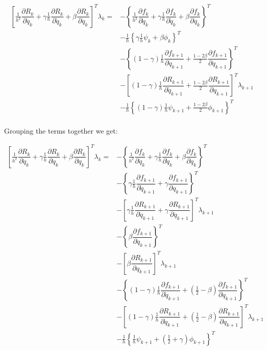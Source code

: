 \documentclass[10pt,letter]{book}
\newcommand{\pd}[2]{\dfrac{\partial #1}{\partial #2}}
\begin{document}
     \begin{equation}
       \begin{split}
         \left[ \frac{1}{h^2} \pd{R_k}{\ddot{q}_k} + \gamma \frac{1}{h} \pd{R_k}{\dot{q}_k} + \beta \pd{R_k}{{q}_k} \right]^T \lambda_k = &- \left\{ \frac{1}{h^2}  \pd{f_k}{\ddot{q}_k} + \gamma \frac{1}{h} \pd{f_k}{\dot{q}_k} + \beta \pd{f_k}{{q}_k} \right\}^T \\
         & -  \frac{1}{h}\left\{  \gamma \frac{1}{h}  \psi_k + \beta   \phi_k \right\}^T\\
         & -  \left\{ (1-\gamma) \frac{1}{h} \pd{f_{k+1}}{\dot{q}_{k+1}} + \frac{1-2\beta}{2} \pd{f_{k+1}}{{q}_{k+1}} \right\}^T \\
         & -  \left[ (1-\gamma) \frac{1}{h} \pd{R_{k+1}}{\dot{q}_{k+1}} + \frac{1-2\beta}{2} \pd{R_{k+1}}{{q}_{k+1}} \right]^T\lambda_{k+1} \\
         & -  \frac{1}{h} \left\{ (1-\gamma) \frac{1}{h} \psi_{k+1} + \frac{1-2\beta}{2} \phi_{k+1} \right\}^T\\
       \end{split}
     \end{equation}

     
     Grouping the terms together we get:

     \begin{equation}
       \begin{split}
         \left[ \frac{1}{h^2} \pd{R_k}{\ddot{q}_k} + \gamma \frac{1}{h} \pd{R_k}{\dot{q}_k} + \beta \pd{R_k}{{q}_k} \right]^T \lambda_k = &- \left\{ \frac{1}{h^2}  \pd{f_k}{\ddot{q}_k} + \gamma \frac{1}{h} \pd{f_k}{\dot{q}_k} + \beta \pd{f_k}{{q}_k} \right\}^T \\
         & -  \left\{  \gamma \frac{1}{h}  \pd{f_{k+1}}{\dot{q}_{k+1}} +  \gamma \pd{f_{k+1}}{{q}_{k+1}} \right\}^T \\ 
         & -  \left[  \gamma \frac{1}{h}  \pd{R_{k+1}}{\dot{q}_{k+1}} + \gamma \pd{R_{k+1}}{{q}_{k+1}} \right]^T \lambda_{k+1}  \\
         & -  \left\{ \beta \pd{f_{k+1}}{{q}_{k+1}} \right\}^T \\ 
         & - \left[  \beta\pd{R_{k+1}}{{q}_{k+1}} \right]^T \lambda_{k+1}  \\
         & -  \left\{ (1-\gamma) \frac{1}{h} \pd{f_{k+1}}{\dot{q}_{k+1}} + (\frac{1}{2}-\beta) \pd{f_{k+1}}{{q}_{k+1}} \right\}^T \\
         & -  \left[ (1-\gamma) \frac{1}{h} \pd{R_{k+1}}{\dot{q}_{k+1}} + (\frac{1}{2}-\beta) \pd{R_{k+1}}{{q}_{k+1}} \right]^T\lambda_{k+1} \\
         & -  \frac{1}{h} \left\{ \frac{1}{h} \psi_{k+1} + (\frac{1}{2} +\gamma) \phi_{k+1} \right\}^T\\
       \end{split}
     \end{equation}
     
\end{document}
